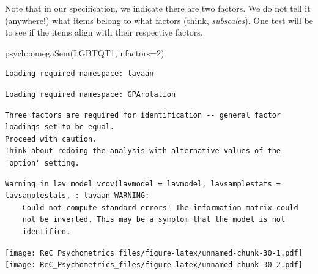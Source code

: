\documentclass[
  english,
]{book}
\newenvironment{Shaded}{\begin{snugshade}}{\end{snugshade}}
\newcommand{\AttributeTok}[1]{\textcolor[rgb]{0.77,0.63,0.00}{#1}}
\newcommand{\DecValTok}[1]{\textcolor[rgb]{0.00,0.00,0.81}{#1}}
\newcommand{\FunctionTok}[1]{\textcolor[rgb]{0.00,0.00,0.00}{#1}}
\newcommand{\NormalTok}[1]{#1}
\newcommand{\SpecialCharTok}[1]{\textcolor[rgb]{0.00,0.00,0.00}{#1}}
\begin{document}
Note that in our specification, we indicate there are two factors. We do not tell it (anywhere!) what items belong to what factors (think, \emph{subscales}). One test will be to see if the items align with their respective factors.

\begin{Shaded}
\begin{Highlighting}[]
\NormalTok{psych}\SpecialCharTok{::}\FunctionTok{omegaSem}\NormalTok{(LGBTQT1, }\AttributeTok{nfactors=}\DecValTok{2}\NormalTok{)}
\end{Highlighting}
\end{Shaded}

\begin{verbatim}
Loading required namespace: lavaan
\end{verbatim}

\begin{verbatim}
Loading required namespace: GPArotation
\end{verbatim}

\begin{verbatim}
Three factors are required for identification -- general factor loadings set to be equal. 
Proceed with caution. 
Think about redoing the analysis with alternative values of the 'option' setting.
\end{verbatim}

\begin{verbatim}
Warning in lav_model_vcov(lavmodel = lavmodel, lavsamplestats = lavsamplestats, : lavaan WARNING:
    Could not compute standard errors! The information matrix could
    not be inverted. This may be a symptom that the model is not
    identified.
\end{verbatim}

\texttt{[image: ReC\_Psychometrics\_files/figure-latex/unnamed-chunk-30-1.pdf]} \texttt{[image: ReC\_Psychometrics\_files/figure-latex/unnamed-chunk-30-2.pdf]}
\end{document}

